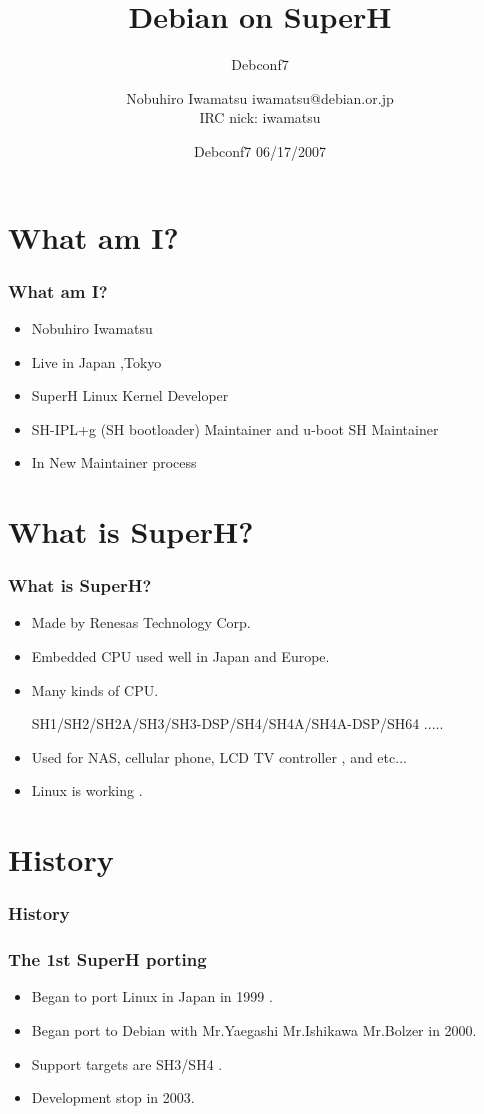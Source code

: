 \documentclass[cjk,dvipdfmx,12pt]{beamer}
\title{Debian on SuperH}
\subtitle{Debconf7}
\author{Nobuhiro Iwamatsu iwamatsu@debian.or.jp\\IRC nick: iwamatsu}
\date{Debconf7 06/17/2007}
\begin{document}
\frame{\titlepage{}}

\section{What am I?}

\begin{frame}
 \frametitle{What am I?}
 \begin{itemize}
  \item Nobuhiro Iwamatsu
  \item Live in Japan ,Tokyo
  \item SuperH Linux Kernel Developer
  \item SH-IPL+g (SH bootloader) Maintainer and u-boot SH Maintainer
  \item In New Maintainer process
    
 \end{itemize}
\end{frame}


\section{What is SuperH?}

\begin{frame}
 \frametitle{What is SuperH?}
 \begin{itemize}
  \item Made by Renesas Technology Corp.
  \item Embedded CPU used well in Japan and Europe.
  \item Many kinds of CPU.
  
	SH1/SH2/SH2A/SH3/SH3-DSP/SH4/SH4A/SH4A-DSP/SH64 .....

  \item Used for NAS, cellular phone, LCD TV controller , and etc...
  \item Linux is working .
    
 \end{itemize}
\end{frame}

\section{History}

\begin{frame}
 \frametitle{History}
 
\end{frame}

\begin{frame}
 \frametitle{The 1st SuperH porting}
  \begin{itemize}
    \item Began to port Linux in Japan in 1999 .
    \item Began port to Debian with Mr.Yaegashi Mr.Ishikawa Mr.Bolzer in 2000.
    \item Support targets are SH3/SH4 .
    \item Development stop in 2003. 
  \end{itemize}
\end{frame}
\end{document}
